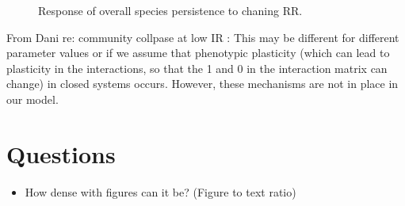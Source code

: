 \begin{figure}
	\centering	
	\renewcommand{\thesubfigure}{}
	\setlength{\subfloatlabelskip}{0pt}
	\caption{Response of overall species persistence to chaning RR.}
	\label{fig:rr_v_species_persistence}
\end{figure}

From Dani re: community collpase at low IR : This may be different for different parameter values or if we assume that phenotypic plasticity (which can lead to plasticity in the interactions, so that the 1 and 0 in the interaction matrix can change) in closed systems occurs. However, these mechanisms are not in place in our model.

\section{Questions}

\begin{itemize}
	\item How dense with figures can it be? (Figure to text ratio)
\end{itemize}